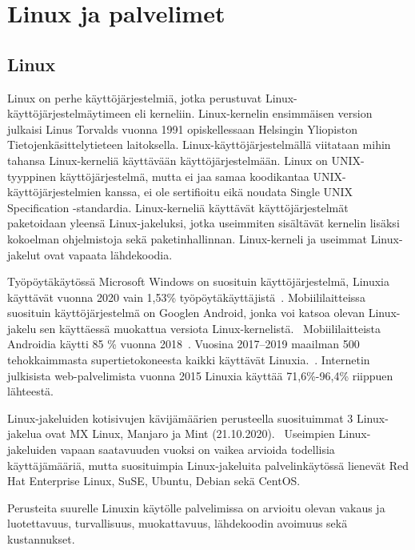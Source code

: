 \chapter{Linux ja palvelimet}\label{linux_ja_palvelimet}

\section{Linux}\label{linux}

Linux on perhe käyttöjärjestelmiä, jotka perustuvat Linux-käyttöjärjestelmäytimeen eli kerneliin. Linux-kernelin ensimmäisen version julkaisi Linus Torvalds vuonna 1991 opiskellessaan Helsingin Yliopiston Tietojenkäsittelytieteen laitoksella. Linux-käyttöjärjestelmällä viitataan mihin tahansa Linux-kerneliä käyttävään käyttöjärjestelmään. Linux on UNIX-tyyppinen käyttöjärjestelmä, mutta ei jaa samaa koodikantaa UNIX-käyttöjärjestelmien kanssa, ei ole sertifioitu eikä noudata Single UNIX Specification -standardia. Linux-kerneliä käyttävät käyttöjärjestelmät paketoidaan yleensä Linux-jakeluksi, jotka useimmiten sisältävät kernelin lisäksi kokoelman ohjelmistoja sekä paketinhallinnan. Linux-kerneli ja useimmat Linux-jakelut ovat vapaata lähdekoodia.~\cite{openbookos}

Työpöytäkäytössä Microsoft Windows on suosituin käyttöjärjestelmä, Linuxia käyttävät vuonna 2020 vain 1,53\% työpöytäkäyttäjistä~\cite{statcounter}. Mobiililaitteissa suosituin käyttöjärjestelmä on Googlen Android, jonka voi katsoa olevan Linux-jakelu sen käyttäessä muokattua versiota Linux-kernelistä.~\cite{google_android} Mobiililaitteista Androidia käytti 85 \% vuonna 2018~\cite{statcounter}. Vuosina 2017–2019 maailman 500 tehokkaimmasta supertietokoneesta kaikki käyttävät Linuxia.~\cite{itsfoss}. Internetin julkisista web-palvelimista vuonna 2015 Linuxia käyttää 71,6\%-96,4\% riippuen lähteestä.~\cite{w3techs}~\cite{w3cook}

Linux-jakeluiden kotisivujen kävijämäärien perusteella suosituimmat 3 Linux-jakelua ovat MX Linux, Manjaro ja Mint (21.10.2020).~\cite{distrowatch} Useimpien Linux-jakeluiden vapaan saatavuuden vuoksi on vaikea arvioida todellisia käyttäjämääriä, mutta suosituimpia Linux-jakeluita palvelinkäytössä lienevät Red Hat Enterprise Linux, SuSE, Ubuntu, Debian sekä CentOS.~\cite{linuxcom}

Perusteita suurelle Linuxin käytölle palvelimissa on arvioitu olevan vakaus ja luotettavuus, turvallisuus, muokattavuus, lähdekoodin avoimuus sekä kustannukset.~\cite{linuxjournal}

